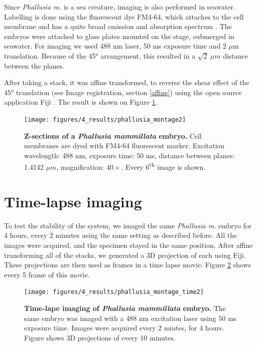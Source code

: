 \documentclass{tdk_style}
\begin{document}
Since \textit{Phallusia m.} is a sea creature, imaging is also performed in seawater. Labelling is done using the fluorescent dye FM4-64, which attaches to the cell membrane and has a quite broad emission and absorption spectrum \cite{bolte_FM-dyes_2004}. The embryos were attached to glass plates mounted on the stage, submerged in seawater. For imaging we used 488 nm laser, 50 ms exposure time and 2 $\mu$m translation. Because of the 45° arrangement, this resulted in a  $\sqrt{2}\ \mu m$ distance between the planes.

After taking a stack, it was affine transformed, to reverse the shear effect of the 45° translation (see Image registration, section \ref{affine}) using the open source application Fiji \cite{schindelin_fiji:_2012}. The result is shown on Figure \ref{fig:ph1}.


\begin{figure}[htbp]
	\centering
	\texttt{[image: figures/4\_results/phallusia\_montage2]}
	\caption{\textbf{Z-sections of a \textit{Phallusia mammillata} embryo.} Cell membranes are dyed with FM4-64 fluorescent marker. Excitation wavelength: 488 nm, exposure time: 50 ms, distance between planes: 1.4142 $\mu m$, magnification: $40\times$. Every 6\textsuperscript{th} image is shown.}
	\label{fig:ph1}
\end{figure}

\section{Time-lapse imaging}

To test the stability of the system, we imaged the same \textit{Phallusia m.} embryo for 4 hours, every 2 minutes using the same setting as described before. All the images were acquired, and the specimen stayed in the same position. After affine transforming all of the stacks, we generated a 3D projection of each using Fiji. These projections are then used as frames in a time lapse movie. Figure \ref{fig:ph2} shows every 5 frame of this movie.

\begin{figure}[htbp]
	\centering
	\texttt{[image: figures/4\_results/phallusia\_montage\_time2]}
	\caption{\textbf{Time-lape imaging of \textit{Phallusia mammillata} embryo.} The same embryo was imaged with a 488 nm excitation laser using 50 ms exposure time. Images were acquired every 2 miutes, for 4 hours. Figure shows 3D projections of every 10 minutes.}
	\label{fig:ph2}
\end{figure}
\end{document}
